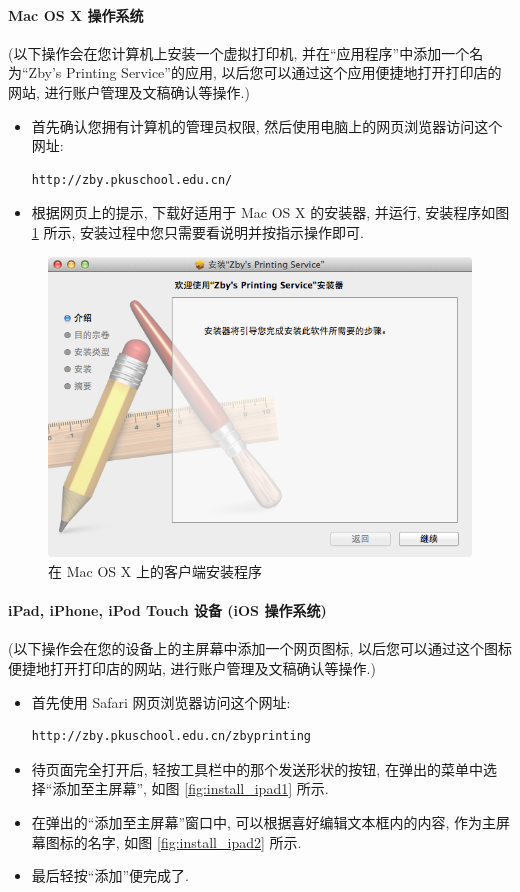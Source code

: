\documentclass{article}
\begin{document}
\begin{CJK}{UTF8}{gbsn}
			\paragraph{Mac OS X 操作系统}
				(以下操作会在您计算机上安装一个虚拟打印机, 并在``应用程序''中添加一个名为``Zby's Printing Service''的应用, 以后您可以通过这个应用便捷地打开打印店的网站, 进行账户管理及文稿确认等操作.)
				\begin{itemize}
					\item{首先确认您拥有计算机的管理员权限, 然后使用电脑上的网页浏览器访问这个网址: \begin{verbatim}http://zby.pkuschool.edu.cn/\end{verbatim}}
					\item{根据网页上的提示, 下载好适用于 Mac OS X 的安装器, 并运行, 安装程序如图 \ref{fig:installer_mac} 所示, 安装过程中您只需要看说明并按指示操作即可.}
				\end{itemize}
				
				\begin{figure}[hp]
					\centering
					\includegraphics[height=0.45\textheight]{installer_mac.png}
					\caption{在 Mac OS X 上的客户端安装程序}
					\label{fig:installer_mac}
				\end{figure}
				\clearpage
			\paragraph{iPad, iPhone, iPod Touch 设备 (iOS 操作系统)}
				(以下操作会在您的设备上的主屏幕中添加一个网页图标, 以后您可以通过这个图标便捷地打开打印店的网站, 进行账户管理及文稿确认等操作.)
				\begin{itemize}
					\item{首先使用 Safari 网页浏览器访问这个网址: \begin{verbatim}http://zby.pkuschool.edu.cn/zbyprinting\end{verbatim}}
					\item{待页面完全打开后, 轻按工具栏中的那个发送形状的按钮, 在弹出的菜单中选择``添加至主屏幕'', 如图 \ref{fig:install_ipad1} 所示.}
					\item{在弹出的``添加至主屏幕''窗口中, 可以根据喜好编辑文本框内的内容, 作为主屏幕图标的名字, 如图 \ref{fig:install_ipad2} 所示.}
					\item{最后轻按``添加''便完成了.}
				\end{itemize}
				

\end{CJK}
\end{document}

